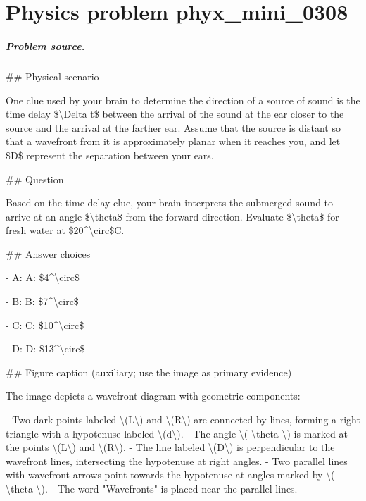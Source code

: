 
\chapter{Physics problem phyx\_mini\_0308}
\label{ch:PhyXMiniProblems_problem_phyx_mini_0308}

\paragraph{Problem source.}
\#\# Physical scenario

One clue used by your brain to determine the direction of a source of sound is the time delay \$\textbackslash{}Delta t\$ between the arrival of the sound at the ear closer to the source and the arrival at the farther ear. Assume that the source is distant so that a wavefront from it is approximately planar when it reaches you, and let \$D\$ represent the separation between your ears.

\#\# Question

Based on the time-delay clue, your brain interprets the submerged sound to arrive at an angle \$\textbackslash{}theta\$ from the forward direction. Evaluate \$\textbackslash{}theta\$ for fresh water at \$20\textasciicircum{}\textbackslash{}circ\$C.

\#\# Answer choices

- A: A: \$4\textasciicircum{}\textbackslash{}circ\$

- B: B: \$7\textasciicircum{}\textbackslash{}circ\$

- C: C: \$10\textasciicircum{}\textbackslash{}circ\$

- D: D: \$13\textasciicircum{}\textbackslash{}circ\$

\#\# Figure caption (auxiliary; use the image as primary evidence)

The image depicts a wavefront diagram with geometric components:

- Two dark points labeled \textbackslash{}(L\textbackslash{}) and \textbackslash{}(R\textbackslash{}) are connected by lines, forming a right triangle with a hypotenuse labeled \textbackslash{}(d\textbackslash{}).
- The angle \textbackslash{}( \textbackslash{}theta \textbackslash{}) is marked at the points \textbackslash{}(L\textbackslash{}) and \textbackslash{}(R\textbackslash{}).
- The line labeled \textbackslash{}(D\textbackslash{}) is perpendicular to the wavefront lines, intersecting the hypotenuse at right angles.
- Two parallel lines with wavefront arrows point towards the hypotenuse at angles marked by \textbackslash{}( \textbackslash{}theta \textbackslash{}).
- The word "Wavefronts" is placed near the parallel lines.

